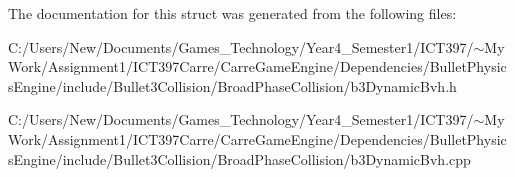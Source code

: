 The documentation for this struct was generated from the following files:\begin{CompactItemize}
\item 
C:/Users/New/Documents/Games\_\-Technology/Year4\_\-Semester1/ICT397/$\sim$My Work/Assignment1/ICT397Carre/CarreGameEngine/Dependencies/BulletPhysicsEngine/include/Bullet3Collision/BroadPhaseCollision/b3DynamicBvh.h\item 
C:/Users/New/Documents/Games\_\-Technology/Year4\_\-Semester1/ICT397/$\sim$My Work/Assignment1/ICT397Carre/CarreGameEngine/Dependencies/BulletPhysicsEngine/include/Bullet3Collision/BroadPhaseCollision/b3DynamicBvh.cpp\end{CompactItemize}
